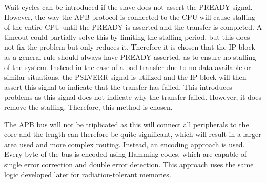 Wait cycles can be introduced if the slave does not assert the PREADY signal. However, the way the APB protocol is connected to the CPU will cause stalling of the entire CPU until the PREADY is asserted and the transfer is completed. A timeout could partially solve this by limiting the stalling period, but this does not fix the problem but only reduces it. Therefore it is chosen that the IP block as a general rule should always have PREADY asserted, as to ensure no stalling of the system. Instead in the case of a bad transfer due to no data available or similar situations, the PSLVERR signal is utilized and the IP block will then assert this signal to indicate that the transfer has failed. This introduces problems as this signal does not indicate why the transfer failed. However, it does remove the stalling. Therefore, this method is chosen. 

The APB bus will not be triplicated as this will connect all peripherals to the core and the length can therefore be quite significant, which will result in a larger area used and more complex routing. Instead, an encoding approach is used. Every byte of the bus is encoded using Hamming codes, which are capable of single error correction and double error detection. This approach uses the same logic developed later for radiation-tolerant memories. 


